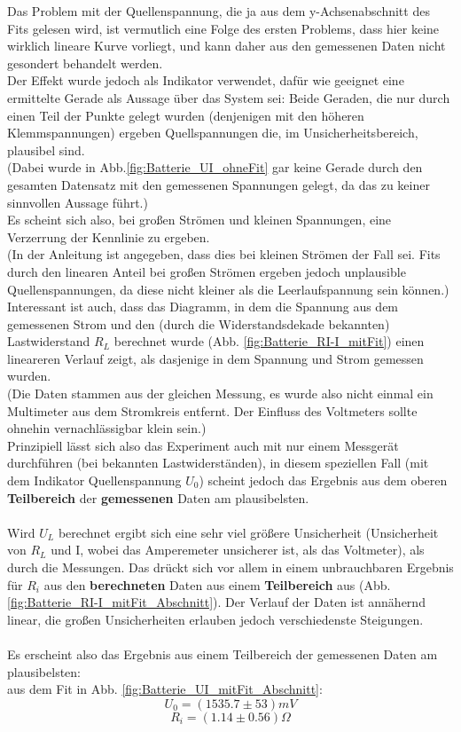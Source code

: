 \documentclass[12pt,a4paper]{article}
\begin{document}
\begin{multicols}{2}
\noindent Das Problem mit der Quellenspannung, die ja aus dem y-Achsenabschnitt des Fits gelesen wird, ist vermutlich eine Folge des ersten Problems, dass hier keine wirklich lineare Kurve vorliegt, und kann daher aus den gemessenen Daten nicht gesondert behandelt werden.\\
Der Effekt wurde jedoch als Indikator verwendet, dafür wie geeignet eine ermittelte Gerade als Aussage über das System sei: Beide Geraden, die nur durch einen Teil der Punkte gelegt wurden (denjenigen mit den höheren Klemmspannungen) ergeben Quellspannungen die, im Unsicherheitsbereich, plausibel sind.\\
(Dabei wurde in Abb.\ref{fig:Batterie_UI_ohneFit} gar keine Gerade durch den gesamten Datensatz mit den gemessenen Spannungen gelegt, da das zu keiner sinnvollen Aussage führt.)\\
Es scheint sich also, bei großen Strömen und kleinen Spannungen, eine Verzerrung der Kennlinie zu ergeben.\\
(In der Anleitung ist angegeben, dass dies bei kleinen Strömen der Fall sei. Fits durch den linearen Anteil bei großen Strömen ergeben jedoch unplausible Quellenspannungen, da diese nicht kleiner als die Leerlaufspannung sein können.)
\\
Interessant ist auch, dass das Diagramm, in dem die Spannung aus dem gemessenen Strom und den (durch die Widerstandsdekade bekannten) Lastwiderstand $R_L$ berechnet wurde (Abb. \ref{fig:Batterie_RI-I_mitFit}) einen lineareren Verlauf zeigt, als dasjenige in dem Spannung und Strom gemessen wurden.\\
(Die Daten stammen aus der gleichen Messung, es wurde also nicht einmal ein Multimeter aus dem Stromkreis entfernt. Der Einfluss des Voltmeters sollte ohnehin vernachlässigbar klein sein.)\\
Prinzipiell lässt sich also das Experiment auch mit nur einem Messgerät durchführen (bei bekannten Lastwiderständen), in diesem speziellen Fall (mit dem Indikator Quellenspannung $U_0$) scheint jedoch das Ergebnis aus dem oberen \textbf{Teilbereich} der \textbf{gemessenen} Daten am plausibelsten.\\
\\
Wird $U_L$ berechnet ergibt sich eine sehr viel größere Unsicherheit (Unsicherheit von $R_L$ und I, wobei das Amperemeter unsicherer ist, als das Voltmeter), als durch die Messungen. Das drückt sich vor allem in einem unbrauchbaren Ergebnis für $R_i$ aus den \textbf{berechneten} Daten aus einem 
\textbf{Teilbereich} aus (Abb. \ref{fig:Batterie_RI-I_mitFit_Abschnitt}). Der Verlauf der Daten ist annähernd linear, die großen Unsicherheiten erlauben jedoch verschiedenste Steigungen.\\
\\
Es erscheint also das Ergebnis aus einem Teilbereich der gemessenen Daten am plausibelsten:\\
\noindent aus dem Fit in Abb. \ref{fig:Batterie_UI_mitFit_Abschnitt}:
	$$U_0=(1535.7 \pm 53)mV$$
	$$R_i=(1.14 \pm 0.56)\Omega$$
	

\end{multicols}
\end{document}
